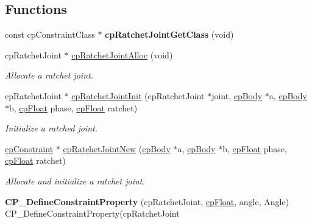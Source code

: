 \subsection*{Functions}
\begin{DoxyCompactItemize}
\item 
\hypertarget{group__cp_ratchet_joint_gac3f33d6588e1d60492029c8e8cdb6939}{const cp\-Constraint\-Class $\ast$ {\bfseries cp\-Ratchet\-Joint\-Get\-Class} (void)}\label{group__cp_ratchet_joint_gac3f33d6588e1d60492029c8e8cdb6939}

\item 
\hypertarget{group__cp_ratchet_joint_gadee71c6fb85f91900f4aea640269c7a4}{cp\-Ratchet\-Joint $\ast$ \hyperlink{group__cp_ratchet_joint_gadee71c6fb85f91900f4aea640269c7a4}{cp\-Ratchet\-Joint\-Alloc} (void)}\label{group__cp_ratchet_joint_gadee71c6fb85f91900f4aea640269c7a4}

\begin{DoxyCompactList}\small\item\em Allocate a ratchet joint. \end{DoxyCompactList}\item 
\hypertarget{group__cp_ratchet_joint_ga712d5ebfd8200a2baaf99640d844224f}{cp\-Ratchet\-Joint $\ast$ \hyperlink{group__cp_ratchet_joint_ga712d5ebfd8200a2baaf99640d844224f}{cp\-Ratchet\-Joint\-Init} (cp\-Ratchet\-Joint $\ast$joint, \hyperlink{structcp_body}{cp\-Body} $\ast$a, \hyperlink{structcp_body}{cp\-Body} $\ast$b, \hyperlink{group__basic_types_gac1ed65573e035bf892505768c852d8d3}{cp\-Float} phase, \hyperlink{group__basic_types_gac1ed65573e035bf892505768c852d8d3}{cp\-Float} ratchet)}\label{group__cp_ratchet_joint_ga712d5ebfd8200a2baaf99640d844224f}

\begin{DoxyCompactList}\small\item\em Initialize a ratched joint. \end{DoxyCompactList}\item 
\hypertarget{group__cp_ratchet_joint_ga6743e0aee6389ecc2bc10ee42e5baaec}{\hyperlink{structcp_constraint}{cp\-Constraint} $\ast$ \hyperlink{group__cp_ratchet_joint_ga6743e0aee6389ecc2bc10ee42e5baaec}{cp\-Ratchet\-Joint\-New} (\hyperlink{structcp_body}{cp\-Body} $\ast$a, \hyperlink{structcp_body}{cp\-Body} $\ast$b, \hyperlink{group__basic_types_gac1ed65573e035bf892505768c852d8d3}{cp\-Float} phase, \hyperlink{group__basic_types_gac1ed65573e035bf892505768c852d8d3}{cp\-Float} ratchet)}\label{group__cp_ratchet_joint_ga6743e0aee6389ecc2bc10ee42e5baaec}

\begin{DoxyCompactList}\small\item\em Allocate and initialize a ratchet joint. \end{DoxyCompactList}\item 
\hypertarget{group__cp_ratchet_joint_ga4281b8476f16e590f7ee2080252fde99}{{\bfseries C\-P\-\_\-\-Define\-Constraint\-Property} (cp\-Ratchet\-Joint, \hyperlink{group__basic_types_gac1ed65573e035bf892505768c852d8d3}{cp\-Float}, angle, Angle) C\-P\-\_\-\-Define\-Constraint\-Property(cp\-Ratchet\-Joint}\label{group__cp_ratchet_joint_ga4281b8476f16e590f7ee2080252fde99}

\end{DoxyCompactItemize}
